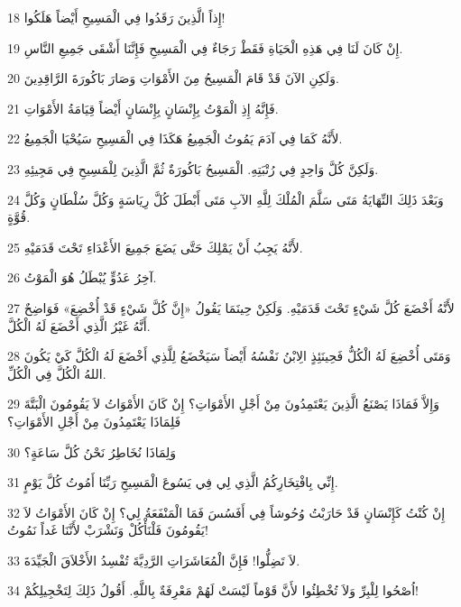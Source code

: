 \par 18 إِذاً الَّذِينَ رَقَدُوا فِي الْمَسِيحِ أَيْضاً هَلَكُوا!
\par 19 إِنْ كَانَ لَنَا فِي هَذِهِ الْحَيَاةِ فَقَطْ رَجَاءٌ فِي الْمَسِيحِ فَإِنَّنَا أَشْقَى جَمِيعِ النَّاسِ.
\par 20 وَلَكِنِ الآنَ قَدْ قَامَ الْمَسِيحُ مِنَ الأَمْوَاتِ وَصَارَ بَاكُورَةَ الرَّاقِدِينَ.
\par 21 فَإِنَّهُ إِذِ الْمَوْتُ بِإِنْسَانٍ بِإِنْسَانٍ أَيْضاً قِيَامَةُ الأَمْوَاتِ.
\par 22 لأَنَّهُ كَمَا فِي آدَمَ يَمُوتُ الْجَمِيعُ هَكَذَا فِي الْمَسِيحِ سَيُحْيَا الْجَمِيعُ.
\par 23 وَلَكِنَّ كُلَّ وَاحِدٍ فِي رُتْبَتِهِ. الْمَسِيحُ بَاكُورَةٌ ثُمَّ الَّذِينَ لِلْمَسِيحِ فِي مَجِيئِهِ.
\par 24 وَبَعْدَ ذَلِكَ النِّهَايَةُ مَتَى سَلَّمَ الْمُلْكَ لِلَّهِ الآبِ مَتَى أَبْطَلَ كُلَّ رِيَاسَةٍ وَكُلَّ سُلْطَانٍ وَكُلَّ قُوَّةٍ.
\par 25 لأَنَّهُ يَجِبُ أَنْ يَمْلِكَ حَتَّى يَضَعَ جَمِيعَ الأَعْدَاءِ تَحْتَ قَدَمَيْهِ.
\par 26 آخِرُ عَدُوٍّ يُبْطَلُ هُوَ الْمَوْتُ.
\par 27 لأَنَّهُ أَخْضَعَ كُلَّ شَيْءٍ تَحْتَ قَدَمَيْهِ. وَلَكِنْ حِينَمَا يَقُولُ «إِنَّ كُلَّ شَيْءٍ قَدْ أُخْضِعَ» فَوَاضِحٌ أَنَّهُ غَيْرُ الَّذِي أَخْضَعَ لَهُ الْكُلَّ.
\par 28 وَمَتَى أُخْضِعَ لَهُ الْكُلُّ فَحِينَئِذٍ الِابْنُ نَفْسُهُ أَيْضاً سَيَخْضَعُ لِلَّذِي أَخْضَعَ لَهُ الْكُلَّ كَيْ يَكُونَ اللهُ الْكُلَّ فِي الْكُلِّ.
\par 29 وَإِلاَّ فَمَاذَا يَصْنَعُ الَّذِينَ يَعْتَمِدُونَ مِنْ أَجْلِ الأَمْوَاتِ؟ إِنْ كَانَ الأَمْوَاتُ لاَ يَقُومُونَ الْبَتَّةَ فَلِمَاذَا يَعْتَمِدُونَ مِنْ أَجْلِ الأَمْوَاتِ؟
\par 30 وَلِمَاذَا نُخَاطِرُ نَحْنُ كُلَّ سَاعَةٍ؟
\par 31 إِنِّي بِافْتِخَارِكُمُ الَّذِي لِي فِي يَسُوعَ الْمَسِيحِ رَبِّنَا أَمُوتُ كُلَّ يَوْمٍ.
\par 32 إِنْ كُنْتُ كَإِنْسَانٍ قَدْ حَارَبْتُ وُحُوشاً فِي أَفَسُسَ فَمَا الْمَنْفَعَةُ لِي؟ إِنْ كَانَ الأَمْوَاتُ لاَ يَقُومُونَ فَلْنَأْكُلْ وَنَشْرَبْ لأَنَّنَا غَداً نَمُوتُ!
\par 33 لاَ تَضِلُّوا! فَإِنَّ الْمُعَاشَرَاتِ الرَّدِيَّةَ تُفْسِدُ الأَخْلاَقَ الْجَيِّدَةَ.
\par 34 اُصْحُوا لِلْبِرِّ وَلاَ تُخْطِئُوا لأَنَّ قَوْماً لَيْسَتْ لَهُمْ مَعْرِفَةٌ بِاللَّهِ. أَقُولُ ذَلِكَ لِتَخْجِيلِكُمْ!
